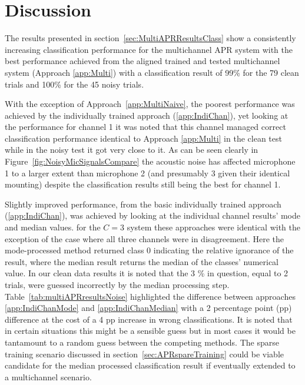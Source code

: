 \section{Discussion}
The results presented in section~\ref{sec:MultiAPRResultsClass} show a consistently increasing classification performance for the multichannel APR system with the best performance achieved from the aligned trained and tested multichannel system (Approach \ref{app:Multi}) with a classification result of 99\% for the 79 clean trials and 100\% for the 45 noisy trials.

With the exception of Approach~\ref{app:MultiNaive}, the poorest performance was achieved by the individually trained approach (\ref{app:IndiChan}), yet looking at the performance for channel 1 it was noted that this channel managed correct classification performance identical to Approach \ref{app:Multi} in the clean test while in the noisy test it got very close to it. As can be seen clearly in Figure~\ref{fig:NoisyMicSignalsCompare} the acoustic noise has affected microphone 1 to a larger extent than microphone 2 (and presumably 3 given their identical mounting) despite the classification results still being the best for channel 1.

Slightly improved performance, from the basic individually trained approach (\ref{app:IndiChan}), was achieved by looking at the individual channel results' mode and median values. for the $C=3$ system these approaches were identical with the exception of the case where all three channels were in disagreement. Here the mode-processed method returned class 0 indicating the relative ignorance of the result, where the median result returns the median of the classes' numerical value. In our clean data results it is noted that the 3 \% in question, equal to 2 trials, were guessed incorrectly by the median processing step. Table~\ref{tab:multiAPRresultsNoise} highlighted the difference between approaches \ref{app:IndiChanMode} and \ref{app:IndiChanMedian} with a 2 percentage point (pp) difference at the cost of a 4 pp increase in wrong classifications. It is noted that in certain situations this might be a sensible guess but in most cases it would be tantamount to a random guess between the competing methods. The sparse training scenario discussed in section~\ref{sec:APRspareTraining} could be viable candidate for the median processed classification result if eventually extended to a multichannel scenario.

